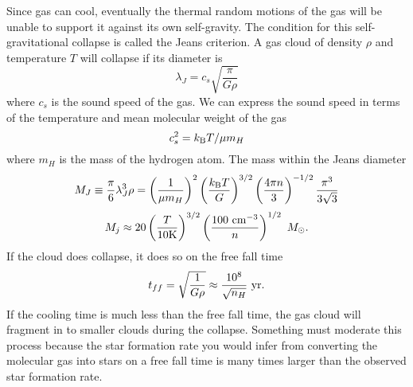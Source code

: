 \documentclass[]{article}
\begin{document}
Since gas can cool, eventually the thermal random motions of the gas will be unable to support
it against its own self-gravity. The condition for this self-gravitational collapse is called the
Jeans criterion. A gas cloud of density $\rho$ and temperature $T$ will collapse if its 
diameter is
\begin{equation}
\lambda_J = c_s \sqrt{\frac{\pi}{G\rho}}
\end{equation}
\noindent
where $c_s$ is the sound speed of the gas. We can express the sound speed
in terms of the temperature and mean molecular weight of the gas
\begin{equation}
c_s^{2} = k_{\mathrm{B}} T / \mu m_{H}
\end{equation}
\noindent
where $m_H$ is the mass of the hydrogen atom.  The mass within the Jeans diameter
\begin{equation}
M_J \equiv \frac{\pi}{6} \lambda_J^3 \rho = \left(\frac{1}{\mu m_H}\right)^2 \left(\frac{k_{\mathrm{B}} T}{G}\right)^{3/2} \left(\frac{4\pi n}{3}\right)^{-1/2} \frac{\pi^3}{3\sqrt{3}}
\end{equation}
\begin{equation}
M_j \approx 20 \left(\frac{T}{10\mathrm{K}}\right)^{3/2} \left(\frac{100~\mathrm{cm}^{-3}}{n}\right)^{1/2}~M_{\odot}.
\end{equation}
\noindent
If the cloud does collapse, it does so on the free fall time
\begin{equation}
t_{ff} = \sqrt{\frac{1}{G\rho}} \approx \frac{10^8}{\sqrt{n_H}}~\mathrm{yr}.
\end{equation}
\noindent
If the cooling time is much less than the free fall time, the gas cloud will fragment in to smaller clouds during the collapse.
Something must moderate this process because the star formation rate you would infer from converting the molecular gas into stars on a free fall time is many times larger than the observed star formation rate.
\end{document}
